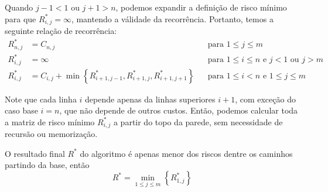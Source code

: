 Quando $j - 1 < 1$ ou $j + 1 > n$, podemos expandir a definição de risco mínimo para que $R^*_{i, j} = \infty$, mantendo a válidade da recorrência. Portanto, temos a seguinte relação de recorrência:
\begin{align*}
    R^*_{n, j} &= C_{n, j} && \text{para $1 \leq j \leq m$}\\
    R^*_{i, j} &= \infty && \text{para $1 \leq i \leq n$ e $j < 1$ ou $j > m$} \\
    R^*_{i, j} &= C_{i, j} + \min\left\{R^*_{i+1,j-1}, R^*_{i+1,j}, R^*_{i+1,j+1}\right\} && \text{para $1 \leq i < n$ e $1 \leq j \leq m$}
\end{align*}

Note que cada linha $i$ depende apenas da linhas superiores $i+1$, com exceção do caso base $i = n$, que não depende de outros custos. Então, podemos calcular toda a matriz de risco mínimo $R^*_{i, j}$ a partir do topo da parede, sem necessidade de recursão ou memorização.

O resultado final $R^*$ do algoritmo é apenas menor dos riscos dentre os caminhos partindo da base, então
\[
    R^* = \min_{1 \leq j \leq m}\left\{R^*_{1, j}\right\}
\]


